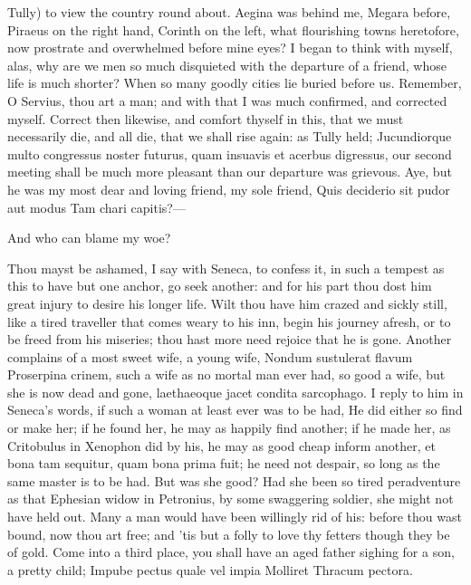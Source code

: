 {Tully) to view the country round about. Aegina was behind me, Megara
before, Piraeus on the right hand, Corinth on the left, what
flourishing towns heretofore, now prostrate and overwhelmed before mine
eyes? I began to think with myself, alas, why are we men so much
disquieted with the departure of a friend, whose life is much shorter?
When so many goodly cities lie buried before us. Remember, O
Servius, thou art a man; and with that I was much confirmed, and
corrected myself. Correct then likewise, and comfort thyself in this,
that we must necessarily die, and all die, that we shall rise again: as
Tully held; Jucundiorque multo congressus noster futurus, quam insuavis
et acerbus digressus, our second meeting shall be much more pleasant
than our departure was grievous.
Aye, but he was my most dear and loving friend, my sole friend,
Quis deciderio sit pudor aut modus
Tam chari capitis?---

And who can blame my woe?

Thou mayst be ashamed, I say with Seneca, to confess it, in such
a tempest as this to have but one anchor, go seek another: and
for his part thou dost him great injury to desire his longer life.
Wilt thou have him crazed and sickly still, like a tired
traveller that comes weary to his inn, begin his journey afresh, or to
be freed from his miseries; thou hast more need rejoice that he is
gone. Another complains of a most sweet wife, a young wife, Nondum
sustulerat flavum Proserpina crinem, such a wife as no mortal man ever
had, so good a wife, but she is now dead and gone, laethaeoque jacet
condita sarcophago. I reply to him in Seneca's words, if such a woman
at least ever was to be had, He did either so find or make her;
if he found her, he may as happily find another; if he made her, as
Critobulus in Xenophon did by his, he may as good cheap inform another,
et bona tam sequitur, quam bona prima fuit; he need not despair, so
long as the same master is to be had. But was she good? Had she been so
tired peradventure as that Ephesian widow in Petronius, by some
swaggering soldier, she might not have held out. Many a man would have
been willingly rid of his: before thou wast bound, now thou art free;
and 'tis but a folly to love thy fetters though they be of gold.
Come into a third place, you shall have an aged father sighing for a
son, a pretty child;
Impube pectus quale vel impia
Molliret Thracum pectora.

}
